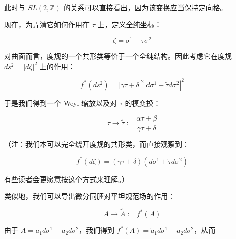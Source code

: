 此时与 $SL(2,\mathbb{Z})$ 的关系可以直接看出，因为该变换应当保持定向格。

现在，为弄清它如何作用在 $\tau$ 上，定义全纯坐标：

\begin{equation}
  \zeta=\sigma^1+\tau\sigma^2
  \tag{2.231}
  \label{eq:2.231}
\end{equation}

对曲面而言，度规的一个共形类等价于一个全纯结构。因此考虑它在度规 $ds^2=|d\zeta|^2$ 上的作用：

\begin{equation}
  f^*(ds^2)=|\gamma\tau+\delta|^2\left|d\sigma^1+\tilde\tau d\sigma^2\right|^2
  \tag{2.232}
  \label{eq:2.232}
\end{equation}

于是我们得到一个 Weyl 缩放以及对 $\tau$ 的模变换：

\begin{equation}
  \tau\to\tilde\tau:=\frac{\alpha\tau+\beta}{\gamma\tau+\delta}
  \tag{2.233}
  \label{eq:2.233}
\end{equation}

（注：我们本可以完全绕开度规的共形类，而直接观察到：

\begin{equation}
  f^*(d\zeta)=(\gamma\tau+\delta)(d\sigma^1+\tilde\tau d\sigma^2)
  \tag{2.234}
  \label{eq:2.234}
\end{equation}

有些读者会更愿意按这个方式来理解。）

类似地，我们可以导出微分同胚对平坦规范场的作用：

\begin{equation}
  A\to\tilde A:=f^*(A)
  \tag{2.235}
  \label{eq:2.235}
\end{equation}

由于 $A=a_1d\sigma^1+a_2d\sigma^2$，我们得到 $f^*(A)=\tilde a_1d\sigma^1+\tilde a_2d\sigma^2$，从而


